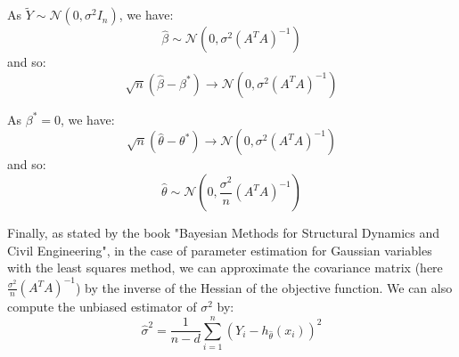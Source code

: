 \documentclass{article}
\begin{document}
As $\tilde{Y} \sim \mathcal{N}(0, \sigma^2 I_n)$, we have:
\[ \hat{\beta} \sim \mathcal{N}(0, \sigma^2 (A^T A)^{-1}) \]
and so:
\[ \sqrt{n}(\hat{\beta} - \beta^* ) \longrightarrow \mathcal{N} (0, \sigma^2 (A^T A)^{-1} ) \]

As $\beta^* = 0$, we have:
\[ \sqrt{n}(\hat{\theta} - \theta^* ) \longrightarrow \mathcal{N} (0, \sigma^2 (A^T A)^{-1} ) \]
and so:
\[ \hat{\theta} \sim \mathcal{N} \left(0, \frac{\sigma^2}{n} (A^T A)^{-1} \right) \]

Finally, as stated by the book "Bayesian Methods for Structural Dynamics and Civil Engineering", in the case of parameter estimation for Gaussian variables with the least squares method, we can approximate the covariance matrix (here $\frac{\sigma^2}{n} (A^T A)^{-1}$) by the inverse of the Hessian of the objective function. We can also compute the unbiased estimator of $\sigma^2$ by:
\[ \hat{\sigma}^2 = \frac{1}{n-d} \sum_{i=1}^{n} (Y_i - h_{\hat{\theta}}(x_i))^2 \]
\end{document}
